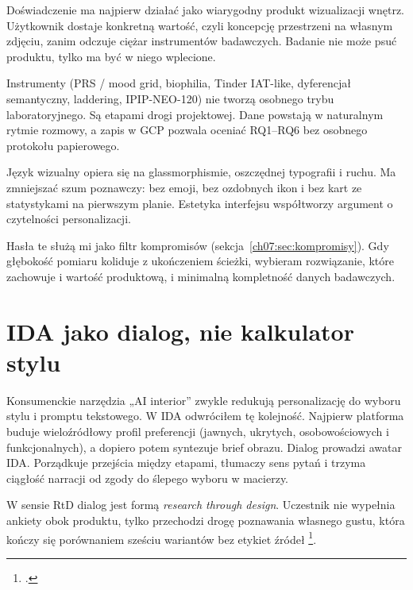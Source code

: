 \begin{description}[style=nextline]
  \item[Product-First]
    Doświadczenie ma najpierw działać jako wiarygodny produkt wizualizacji wnętrz. Użytkownik dostaje konkretną wartość, czyli koncepcję przestrzeni na własnym zdjęciu, zanim odczuje ciężar instrumentów badawczych. Badanie nie może psuć produktu, tylko ma być w niego wplecione.
  \item[Research-Embedded]
    Instrumenty (PRS / mood grid, biophilia, Tinder IAT-like, dyferencjał semantyczny, laddering, IPIP-NEO-120) nie tworzą osobnego trybu laboratoryjnego. Są etapami drogi projektowej. Dane powstają w naturalnym rytmie rozmowy, a zapis w GCP pozwala oceniać RQ1--RQ6 bez osobnego protokołu papierowego.
  \item[Minimalist Glass Design]
    Język wizualny opiera się na glassmorphismie, oszczędnej typografii i ruchu. Ma zmniejszać szum poznawczy: bez emoji, bez ozdobnych ikon i bez kart ze statystykami na pierwszym planie. Estetyka interfejsu współtworzy argument o czytelności personalizacji.
\end{description}

Hasła te służą mi jako filtr kompromisów (sekcja~\ref{ch07:sec:kompromisy}). Gdy głębokość pomiaru koliduje z ukończeniem ścieżki, wybieram rozwiązanie, które zachowuje i wartość produktową, i minimalną kompletność danych badawczych.

\section{IDA jako dialog, nie kalkulator stylu}
\label{ch07:sec:dialog}

Konsumenckie narzędzia „AI interior” zwykle redukują personalizację do wyboru stylu i promptu tekstowego. W IDA odwróciłem tę kolejność. Najpierw platforma buduje wieloźródłowy profil preferencji (jawnych, ukrytych, osobowościowych i funkcjonalnych), a dopiero potem syntezuje brief obrazu.
Dialog prowadzi awatar IDA. Porządkuje przejścia między etapami, tłumaczy sens pytań i trzyma ciągłość narracji od zgody do ślepego wyboru w macierzy.

W sensie RtD dialog jest formą \emph{research through design}. Uczestnik nie wypełnia ankiety obok produktu, tylko przechodzi drogę poznawania własnego gustu, która kończy się porównaniem sześciu wariantów bez etykiet źródeł \footcite{zimmerman2007rtd}.

